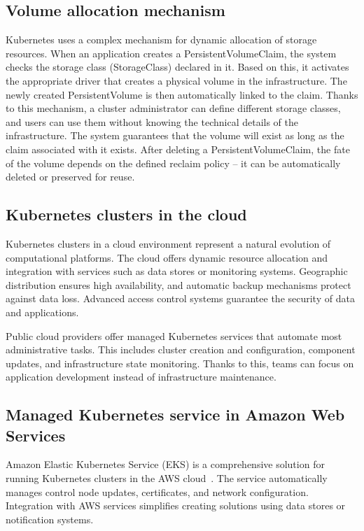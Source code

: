 \subsection{Volume allocation mechanism}
Kubernetes uses a complex mechanism for dynamic allocation of storage resources.
When an application creates a PersistentVolumeClaim, the system checks the storage class (StorageClass) declared in it.
Based on this, it activates the appropriate driver that creates a physical volume in the infrastructure.
The newly created PersistentVolume is then automatically linked to the claim.
Thanks to this mechanism, a cluster administrator can define different storage classes, and users can use them without knowing the technical details of the infrastructure.
The system guarantees that the volume will exist as long as the claim associated with it exists.
After deleting a PersistentVolumeClaim, the fate of the volume depends on the defined reclaim policy -- it can be automatically deleted or preserved for reuse.

\subsection{Kubernetes clusters in the cloud}

Kubernetes clusters in a cloud environment represent a natural evolution of computational platforms.
The cloud offers dynamic resource allocation and integration with services such as data stores or monitoring systems.
Geographic distribution ensures high availability, and automatic backup mechanisms protect against data loss.
Advanced access control systems guarantee the security of data and applications.

Public cloud providers offer managed Kubernetes services that automate most administrative tasks.
This includes cluster creation and configuration, component updates, and infrastructure state monitoring.
Thanks to this, teams can focus on application development instead of infrastructure maintenance.

\subsection{Managed Kubernetes service in Amazon Web Services}\label{subsec:aws-eks}

Amazon Elastic Kubernetes Service (EKS) is a comprehensive solution for running Kubernetes clusters in the AWS cloud~\cite{amazon_eks}.
The service automatically manages control node updates, certificates, and network configuration.
Integration with AWS services simplifies creating solutions using data stores or notification systems.

